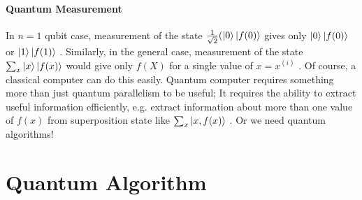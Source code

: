 \documentclass[]{book}
\theoremstyle{nonumberplain}
\begin{document}
\paragraph{Quantum Measurement}
In $n=1$ qubit case, measurement of the state $\frac{1}{\sqrt{2}}(\ket{0}\ket{f(0)}$ gives only $\ket{0}\ket{f(0)}$ or $\ket{1}\ket{f(1)}$ . Similarly, in the general case, measurement of the state $\sum_{x}\ket{x}\ket{f(x)}$ would give only $f(X)$ for a single value of $x=x^{(i)}$ . Of course, a classical computer can do this easily. Quantum computer requires something more than just quantum parallelism to be useful; It requires the ability to extract useful information efficiently, e.g. extract information about more than one value of $f(x)$ from superposition state like $ \sum^{}_{x} \ket{x,f(x)}$ . Or we need quantum algorithms! 

\section{Quantum Algorithm}
\end{document}
